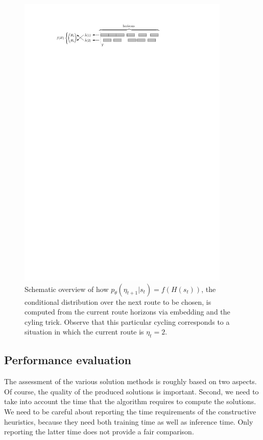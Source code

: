 \documentclass[a4paper]{article}
\theoremstyle{definition}
\theoremstyle{plain}
\begin{document}
\begin{figure}
  \centering
  \includegraphics[width=0.9\textwidth]{figures/embedding}
  \caption{Schematic overview of how
    $p_{\theta}(\eta_{t+1} | s_{t}) = f(H(s_{t}))$, the conditional distribution
    over the next route to be chosen, is computed from the current route
    horizons via embedding and the cyling trick. Observe that this particular
    cycling corresponds to a situation in which the current route is
    $\eta_{t} = 2$.}\label{fig:neural_embedding}
\end{figure}


\subsection{Performance evaluation}

The assessment of the various solution methods is roughly based on two
aspects. Of course, the quality of the produced solutions is important. Second,
we need to take into account the time that the algorithm requires to compute the
solutions. We need to be careful about reporting the time requirements of the
constructive heuristics, because they need both training time as well as
inference time. Only reporting the latter time does not provide a fair
comparison.
\end{document}

